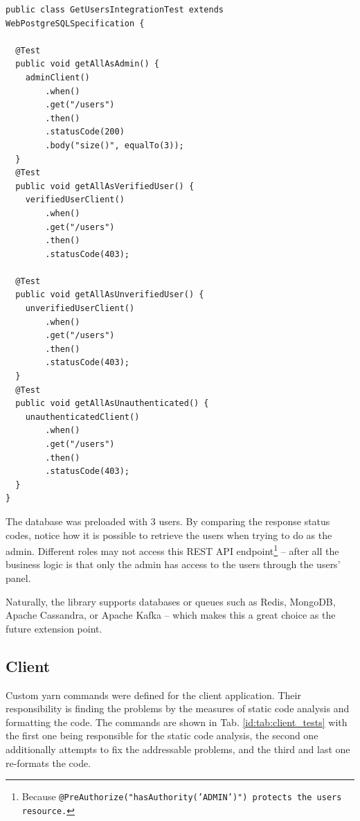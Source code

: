 \documentclass[a4paper,twoside,12pt]{book}
\begin{document}
\begin{verbatim}
public class GetUsersIntegrationTest extends WebPostgreSQLSpecification {

  @Test
  public void getAllAsAdmin() {
    adminClient()
        .when()
        .get("/users")
        .then()
        .statusCode(200)
        .body("size()", equalTo(3));
  }
  @Test
  public void getAllAsVerifiedUser() {
    verifiedUserClient()
        .when()
        .get("/users")
        .then()
        .statusCode(403);

  @Test
  public void getAllAsUnverifiedUser() {
    unverifiedUserClient()
        .when()
        .get("/users")
        .then()
        .statusCode(403);
  }
  @Test
  public void getAllAsUnauthenticated() {
    unauthenticatedClient()
        .when()
        .get("/users")
        .then()
        .statusCode(403);
  }
}
\end{verbatim}

The database was preloaded with 3 users. By comparing the response status codes, notice how it is possible to retrieve the users when trying to do as the admin. Different roles may not access this REST API endpoint\footnote{Because \texttt{@PreAuthorize("hasAuthority('ADMIN')") protects the users resource.}} -- after all the business logic is that only the admin has access to the users through the users' panel.


Naturally, the library supports databases or queues such as Redis, MongoDB, Apache Cassandra, or Apache Kafka -- which makes this a great choice as the future extension point.




\subsection{Client}


Custom yarn commands were defined for the client application. Their responsibility is finding the problems by the measures of static code analysis and formatting the code. The commands are shown in Tab. \ref{id:tab:client_tests} with the first one being responsible for the static code analysis, the second one additionally attempts to fix the addressable problems, and the third and last one re-formats the code.
\end{document}
